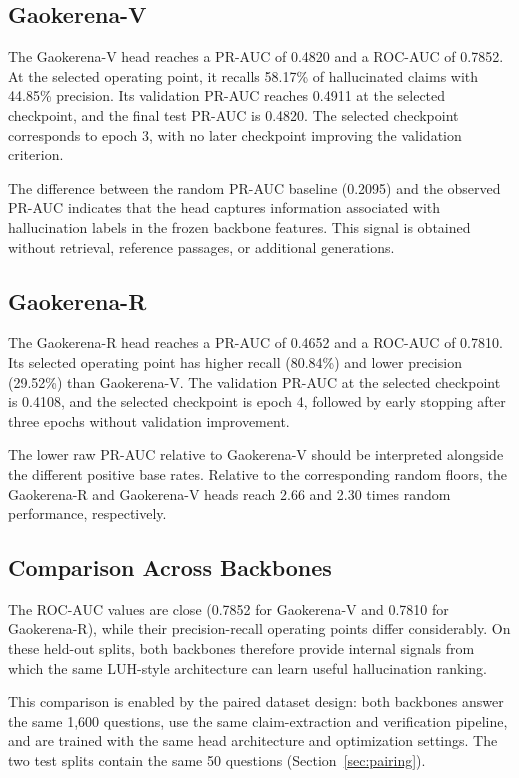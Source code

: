 \documentclass[conference,a4paper]{IEEEtran}
\begin{document}
\subsection{Gaokerena-V}

The Gaokerena-V head reaches a PR-AUC of 0.4820 and a ROC-AUC of 0.7852. At the selected operating point, it recalls 58.17\% of hallucinated claims with 44.85\% precision. Its validation PR-AUC reaches 0.4911 at the selected checkpoint, and the final test PR-AUC is 0.4820. The selected checkpoint corresponds to epoch 3, with no later checkpoint improving the validation criterion.

The difference between the random PR-AUC baseline (0.2095) and the observed PR-AUC indicates that the head captures information associated with hallucination labels in the frozen backbone features. This signal is obtained without retrieval, reference passages, or additional generations.

\subsection{Gaokerena-R}

The Gaokerena-R head reaches a PR-AUC of 0.4652 and a ROC-AUC of 0.7810. Its selected operating point has higher recall (80.84\%) and lower precision (29.52\%) than Gaokerena-V. The validation PR-AUC at the selected checkpoint is 0.4108, and the selected checkpoint is epoch 4, followed by early stopping after three epochs without validation improvement.

The lower raw PR-AUC relative to Gaokerena-V should be interpreted alongside the different positive base rates. Relative to the corresponding random floors, the Gaokerena-R and Gaokerena-V heads reach 2.66 and 2.30 times random performance, respectively.

\subsection{Comparison Across Backbones}

The ROC-AUC values are close (0.7852 for Gaokerena-V and 0.7810 for Gaokerena-R), while their precision-recall operating points differ considerably. On these held-out splits, both backbones therefore provide internal signals from which the same LUH-style architecture can learn useful hallucination ranking.

This comparison is enabled by the paired dataset design: both backbones answer the same 1,600 questions, use the same claim-extraction and verification pipeline, and are trained with the same head architecture and optimization settings. The two test splits contain the same 50 questions (Section~\ref{sec:pairing}).
\end{document}
